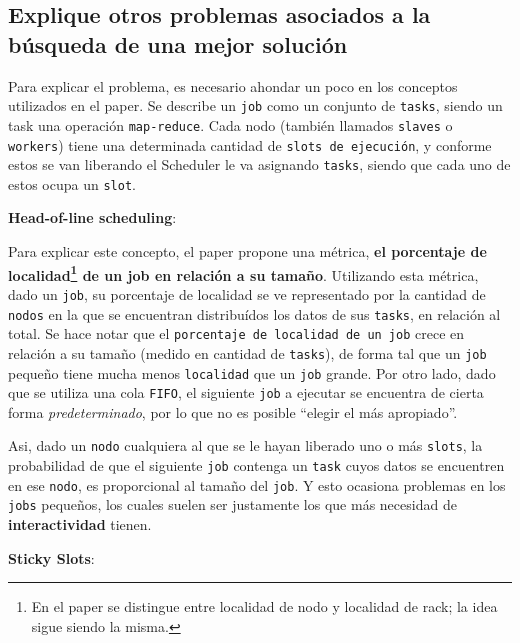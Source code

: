 \documentclass[11pt, a4paper, twoside]{article}
\begin{document}
\fixme

\clearpage
\subsection {\footnotesize Explique otros problemas asociados a la búsqueda de una mejor solución}
\label{investigacion-5}

Para explicar el problema, es necesario ahondar un poco en los conceptos
utilizados en el paper. Se describe un \texttt{job} como un conjunto de
\texttt{tasks}, siendo un task una operación \texttt{map-reduce}. Cada nodo
(también llamados \texttt{slaves} o \texttt{workers}) tiene una determinada
cantidad de \texttt{slots de ejecución}, y conforme estos se van liberando el
Scheduler le va asignando \texttt{tasks}, siendo que cada uno de estos ocupa
un \texttt{slot}. 



\textbf{Head-of-line scheduling}: 

Para explicar este concepto, el paper propone
una métrica, \textbf{el porcentaje de localidad\footnote{En el paper se
distingue entre localidad de nodo y localidad de rack; la idea sigue siendo la
misma.} de un job en relación a su tamaño}. Utilizando esta métrica, dado un
\texttt{job}, su porcentaje de localidad se ve representado por la cantidad de
\texttt{nodos} en la que se encuentran distribuídos los datos de sus
\texttt{tasks}, en relación al total. Se hace notar que el \texttt{porcentaje
de localidad de un job} crece en relación a su tamaño (medido en cantidad de
\texttt{tasks}), de forma tal que un \texttt{job} pequeño tiene mucha menos
\texttt{localidad} que un \texttt{job} grande. Por otro lado, dado que se
utiliza una cola \texttt{FIFO}, el siguiente \texttt{job} a ejecutar se
encuentra de cierta forma \emph{predeterminado}, por lo que no es posible
``elegir el más apropiado''.

Asi, dado un \texttt{nodo} cualquiera al que se le hayan liberado uno o más
\texttt{slots}, la probabilidad de que el siguiente \texttt{job} contenga un
\texttt{task} cuyos datos se encuentren en ese \texttt{nodo}, es proporcional al
tamaño del \texttt{job}. Y esto ocasiona problemas en los \texttt{jobs}
pequeños, los cuales suelen ser justamente los que más necesidad de
\textbf{interactividad} tienen.


\textbf{Sticky Slots}:
\end{document}
